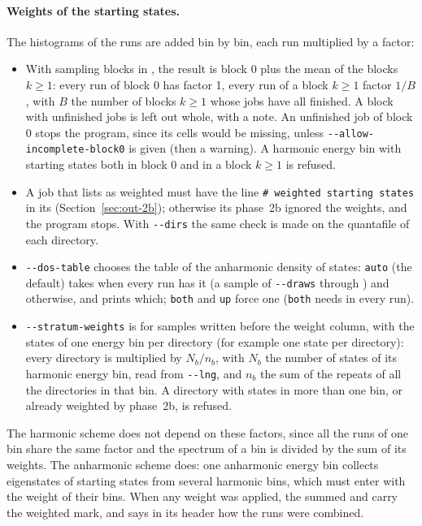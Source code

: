 \paragraph{Weights of the starting states.} The histograms of the runs
are added bin by bin, each run multiplied by a factor:
\begin{itemize}
\item With sampling blocks in , the result is block 0
  plus the mean of the blocks $k \ge 1$: every run of block 0 has factor
  1, every run of a block $k \ge 1$ factor $1/B$, with $B$ the number of
  blocks $k \ge 1$ whose jobs have all finished. A block with unfinished
  jobs is left out whole, with a note. An unfinished job of block 0
  stops the program, since its cells would be missing, unless
  \texttt{-{}-allow-incomplete-block0} is given (then a warning). A
  harmonic energy bin with starting states both in block 0 and in a
  block $k \ge 1$ is refused.
\item A job that  lists as weighted must have the
  line \texttt{\# weighted starting states} in its 
  (Section~\ref{sec:out-2b}); otherwise its phase~2b ignored the
  weights, and the program stops. With \texttt{-{}-dirs} the same check is
  made on the quantafile of each directory.
\item \texttt{-{}-dos-table} chooses the table of the anharmonic
  density of states: \texttt{auto} (the default) takes 
  when every run has it (a sample of 
  \texttt{-{}-draws} through ) and 
  otherwise, and prints which; \texttt{both} and \texttt{up} force one
  (\texttt{both} needs  in every run).
\item \texttt{-{}-stratum-weights} is for samples written before the
  weight column, with the states of one energy bin per directory (for
  example one state per directory): every directory is multiplied by
  $N_b/n_b$, with $N_b$ the number of states of its harmonic energy bin,
  read from \texttt{-{}-lng}, and $n_b$ the sum of the repeats of all the
  directories in that bin. A directory with states in more than one bin,
  or already weighted by phase~2b, is refused.
\end{itemize}
The harmonic scheme does not depend on these factors, since all the runs
of one bin share the same factor and the spectrum of a bin is divided by
the sum of its weights. The anharmonic scheme does: one anharmonic energy
bin collects eigenstates of starting states from several harmonic bins,
which must enter with the weight of their bins. When any weight was
applied, the summed  and  carry
the weighted mark, and  says in its header how
the runs were combined.

